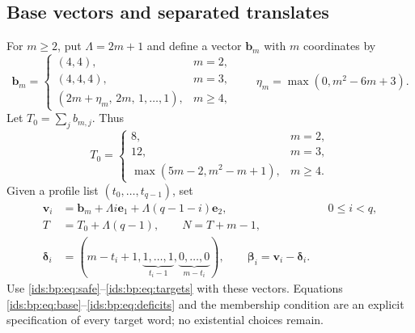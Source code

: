 \documentclass[11pt,letterpaper]{article}
\theoremstyle{definition}\newtheorem{definition}[theorem]{Definition}
\theoremstyle{remark}\newtheorem{remark}[theorem]{Remark}
\theoremstyle{definition}\newtheorem{question}[theorem]{Question}
\begin{document}
\subsection{Base vectors and separated translates}
For $m\geq2$, put $\Lambda=2m+1$ and define a vector $\mathbf b_m$ with $m$
coordinates by
\begin{equation}
 \mathbf b_m=
 \begin{cases}
 (4,4),&m=2,\\
 (4,4,4),&m=3,\\
 (2m+\eta_m,\,2m,\,1,\ldots,1),&m\geq4,
 \end{cases}
 \qquad \eta_m=\max(0,m^2-6m+3).
 \label{ids:bp:eq:base}
\end{equation}
Let $T_0=\sum_j b_{m,j}$. Thus
\begin{equation}
 T_0=
 \begin{cases}
 8,&m=2,\\
 12,&m=3,\\
 \max(5m-2,m^2-m+1),&m\geq4.
 \end{cases}
 \label{ids:bp:eq:T0}
\end{equation}
Given a profile list $(t_0,\ldots,t_{q-1})$, set
\begin{align}
 \mathbf v_i&=\mathbf b_m+\Lambda i\mathbf e_1+\Lambda(q-1-i)\mathbf e_2,
       &&0\leq i<q,\label{ids:bp:eq:centers}\\
 T&=T_0+\Lambda(q-1),\qquad N=T+m-1,\label{ids:bp:eq:length-formula}\\
 \boldsymbol\delta_i
   &=(m-t_i+1,\underbrace{1,\ldots,1}_{t_i-1},
                          \underbrace{0,\ldots,0}_{m-t_i}),
       \qquad\boldsymbol\beta_i=\mathbf v_i-\boldsymbol\delta_i.
 \label{ids:bp:eq:deficits}
\end{align}
Use \eqref{ids:bp:eq:safe}--\eqref{ids:bp:eq:targets} with these vectors.
Equations \eqref{ids:bp:eq:base}--\eqref{ids:bp:eq:deficits} and the
membership condition are an explicit specification of every target word; no
existential choices remain.
\end{document}

